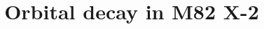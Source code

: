 \documentclass[twocolumn]{aastex631}
\begin{document}
\title{Orbital decay in M82 X-2}


\end{document}
